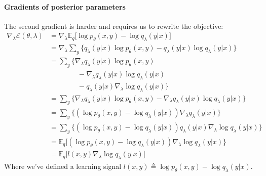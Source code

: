 \paragraph{Gradients of posterior parameters}
The second gradient is harder and requires us to rewrite the objective:
\begin{subequations}
\begin{align*}
\nabla_{\lambda} \mathcal{E}(\theta, \lambda)
        &= \nabla_{\lambda} \mathbb{E}_{q} \big[\log p_{\theta}(x,y)  - \log q_{\lambda}(y | x) \big] \\
        &= \nabla_{\lambda} \sum_{y} \big\{ q_{\lambda}(y | x) \log p_{\theta}(x,y) - q_{\lambda}(y | x)\log q_{\lambda}(y | x) \big\} \\
        &= \sum_{y} \big\{ \nabla_{\lambda} q_{\lambda}(y | x) \log p_{\theta}(x,y) \\
        &\qquad\qquad - \nabla_{\lambda} q_{\lambda}(y | x)\log q_{\lambda}(y | x) \\
        &\qquad\qquad -  q_{\lambda}(y | x)\nabla_{\lambda}\log q_{\lambda}(y | x) \big\} \\
        &= \sum_{y} \big\{ \nabla_{\lambda} q_{\lambda}(y | x) \log p_{\theta}(x,y) - \nabla_{\lambda} q_{\lambda}(y | x)\log q_{\lambda}(y | x) \big\} \\
        &= \sum_{y} \big\{(\log p_{\theta}(x,y) - \log q_{\lambda}(y | x))\nabla_{\lambda} q_{\lambda}(y | x) \big\} \\
        &= \sum_{y} \big\{(\log p_{\theta}(x,y) - \log q_{\lambda}(y | x)) q_{\lambda}(y | x)\nabla_{\lambda} \log q_{\lambda}(y | x) \big\}   \\
        &= \mathbb{E}_{q} \big[ (\log p_{\theta}(x,y) - \log q_{\lambda}(y | x))  \nabla_{\lambda} \log q_{\lambda}(y | x) \big\} \\
        &= \mathbb{E}_{q} \big[ l(x,y) \nabla_{\lambda} \log q_{\lambda}(y | x) \big]
\end{align*}
\end{subequations}
Where we've defined a learning signal $l(x,y) \triangleq \log p_{\theta}(x,y) - \log q_{\lambda}(y | x)$.

